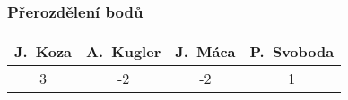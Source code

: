 \documentclass{beamer}
\begin{document}
\begin{frame}[allowframebreaks]\frametitle{Přerozdělení bodů}
    
    \begin{center}
  \begin{tabular}{| c | c | c | c |}
    \hline
     J.~Koza & A.~Kugler & J.~Máca & P.~Svoboda \\
    \hline
     3 & -2 & -2 & 1 \\
    \hline
  \end{tabular}     
   \end{center}
\end{frame}
\end{document}
